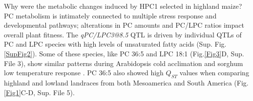 \documentclass[9pt,twocolumn,twoside,lineno]{BioRxiv}
\begin{document}
Why were the metabolic changes induced by HPC1 selected in highland maize?
PC metabolism is intimately connected to multiple stress response and developmental pathways; alterations in PC amounts and PC/LPC ratios impact overall plant fitness.
The \textit{qPC/LPC3@8.5} QTL is driven by individual QTLs of PC and LPC species with high levels of unsaturated fatty acids (Sup. Fig. \ref{SupFig2}).
Some of these species, like PC 36:5 and LPC 18:1  (Fig.\ref{Fig3}D, Sup. File 3), show similar patterns during Arabidopsis cold acclimation \cite{Welti2002-uk} and sorghum low temperature response \cite{Marla2017-ph}.
PC 36:5 also showed high $Q_{ST}$ values when comparing highland and lowland landraces from both Mesoamerica and South America (Fig. \ref{Fig1}C-D, Sup. File 5).
\end{document}
